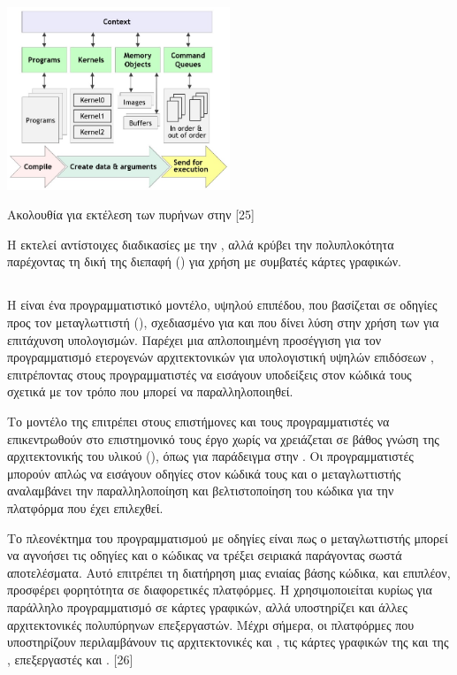 \begin{Illustration}[!h] 
	\centering
	\includegraphics[width=0.5\textwidth]{images/image055.jpg} 
	\caption{Ακολουθία για εκτέλεση των πυρήνων στην  [25]}
	\label{image-3.12}
\end{Illustration}

Η  εκτελεί αντίστοιχες διαδικασίες με την , αλλά κρύβει την πολυπλοκότητα παρέχοντας τη δική της διεπαφή () για χρήση με συμβατές κάρτες γραφικών. 

\subsection{}

Η  είναι ένα προγραμματιστικό μοντέλο, υψηλού επιπέδου, που βασίζεται σε οδηγίες προς τον μεταγλωττιστή (), σχεδιασμένο για  και  που δίνει λύση στην χρήση των  για επιτάχυνση υπολογισμών. Παρέχει μια απλοποιημένη προσέγγιση για τον προγραμματισμό ετερογενών αρχιτεκτονικών για υπολογιστική υψηλών επιδόσεων , επιτρέποντας στους προγραμματιστές να εισάγουν υποδείξεις στον κώδικά τους σχετικά με τον τρόπο που μπορεί να παραλληλοποιηθεί.

Το μοντέλο της  επιτρέπει στους επιστήμονες και τους προγραμματιστές να επικεντρωθούν στο επιστημονικό τους έργο χωρίς να χρειάζεται σε βάθος γνώση της αρχιτεκτονικής του υλικού (), όπως για παράδειγμα στην . Οι προγραμματιστές μπορούν απλώς να εισάγουν οδηγίες στον κώδικά τους και ο μεταγλωττιστής αναλαμβάνει την παραλληλοποίηση και βελτιστοποίηση του κώδικα για την πλατφόρμα που έχει επιλεχθεί.

Το πλεονέκτημα του προγραμματισμού με οδηγίες είναι πως ο μεταγλωττιστής μπορεί να αγνοήσει τις οδηγίες και ο κώδικας να τρέξει σειριακά παράγοντας σωστά αποτελέσματα. Αυτό επιτρέπει τη διατήρηση μιας ενιαίας βάσης κώδικα, και επιπλέον, προσφέρει φορητότητα σε διαφορετικές πλατφόρμες. Η  χρησιμοποιείται κυρίως για παράλληλο προγραμματισμό σε κάρτες γραφικών, αλλά υποστηρίζει και άλλες αρχιτεκτονικές πολυπύρηνων επεξεργαστών. Μέχρι σήμερα, οι πλατφόρμες που υποστηρίζουν  περιλαμβάνουν τις αρχιτεκτονικές  και , τις κάρτες γραφικών της  και της , επεξεργαστές  και . [26]

